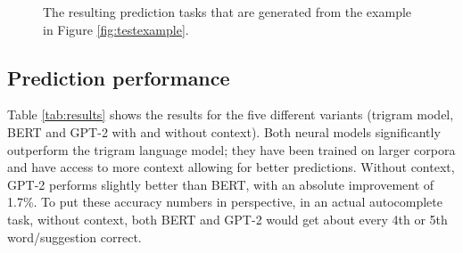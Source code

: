 \documentclass[11pt]{article}
\begin{document}
\begin{figure}
\centering
{}
\caption{The resulting prediction tasks that are generated from the example in Figure \ref{fig:testexample}.}
\label{fig:testing}
\vspace{-2mm}
\end{figure}

\begin{table}[t]
\centering
{}
\caption{Accuracy for the different models on the Wikipedia test corpus of 25K sentence pairs.  Context-aware approaches included the context of the difficult sentence when predicting.} 
\label{tab:results}
\vspace{-2mm}
\end{table}

\subsection{Prediction performance}
Table \ref{tab:results} shows the results for the five different variants (trigram model, BERT and GPT-2 with and without context).  Both neural models significantly outperform the trigram language model; they have been trained on larger corpora and have access to more context allowing for better predictions.  Without context, GPT-2 performs slightly better than BERT, with an absolute improvement of 1.7\%.  To put these accuracy numbers in perspective, in an actual autocomplete task, without context, both BERT and GPT-2 would get about every 4th or 5th word/suggestion correct.
\end{document}
